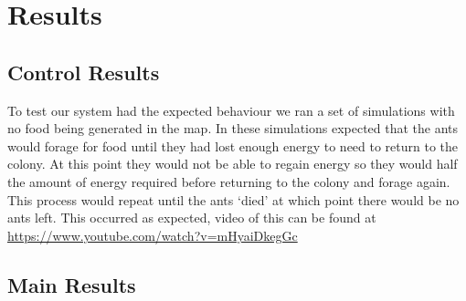 \section{Results}
\subsection{Control Results}
To test our system had the expected behaviour we ran a set of simulations with no food being generated in the map. In these simulations expected that the ants would forage for food until they had lost enough energy to need to return to the colony. At this point they would not be able to regain energy so they would half the amount of energy required before returning to the colony and forage again. This process would repeat until the ants `died' at which point there would be no ants left. This occurred as expected, video of this can be found at \url{https://www.youtube.com/watch?v=mHyaiDkegGc}

\subsection{Main Results}

